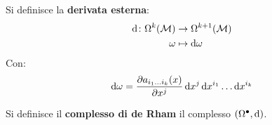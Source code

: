 \begin{definition}
  Si definisce la \textbf{derivata esterna}:
  \begin{align*}
    \operatorname{d}\!{} \colon \Omega^k(\mathcal{M}) & \to \Omega^{k+1}(\mathcal{M}) \\
    \omega & \mapsto \operatorname{d}\!{\omega}
  \end{align*}
  Con:
  \[
    \operatorname{d}\!{\omega} = \frac{\partial a_{i_1\dots i_k}(x )}{\partial x^j} \operatorname{d}\!{x}^j \operatorname{d}\!{x}^{i_1} \dots \operatorname{d}\!{x}^{i_k}
  \]
\end{definition}
\begin{definition}
  Si definisce il \textbf{complesso di de Rham}
  il complesso $ (\Omega^\bullet, \operatorname{d}\!{}) $.
\end{definition}

